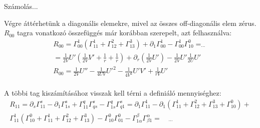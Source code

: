 \documentclass[10pt]{beamer}
\begin{document}
\begin{frame}[t]{Számolás...}
\par Végre áttérhetünk a diagonális elemekre, mivel az összes off-diagonális elem zérus. $R_{00}$ tagra vonatkozó összefüggés már 
korábban szerepelt, azt felhasználva:
\begin{gather*}
R_{00} = \Gamma_{00}^{1}(\Gamma_{11}^{1} + \Gamma_{12}^{2} + \Gamma_{13}^{3}) + \partial_{1}\Gamma_{00}^{1} - \Gamma_{00}^{1}
\Gamma_{10}^{0} = _{\cdots} \\
= \frac{1}{2V}U'(\frac{1}{2V}V' + \frac{1}{r} + \frac{1}{r}) + \partial_{r}(\frac{1}{2V}U') - \frac{1}{2V}U'\frac{1}{2U}U' \\
R_{00} = \frac{1}{2V}U'' - \frac{1}{4UV}U'^{2} - \frac{1}{4V^{2}}U'V' + \frac{1}{rV}U' \\
\end{gather*}
\par A többi tag kiszámításához visszak kell térni a definiáló mennyiséghez:
\begin{gather*}
R_{11} = \partial_{s}\Gamma_{11}^{s} - \partial_{1}\Gamma_{1s}^{s} + \Gamma_{11}^{q}\Gamma_{qs}^{s} - \Gamma_{1s}^{q}\Gamma_{q1}^{s} =
\partial_{1}\Gamma_{11}^{1} - \partial_{1}(\Gamma_{11}^{1} + \Gamma_{12}^{2} + \Gamma_{13}^{3} + \Gamma_{10}^{0}) +\\ 
\Gamma_{11}^{1}(\Gamma_{10}^{0} + \Gamma_{11}^{1} + \Gamma_{12}^{2} + \Gamma_{13}^{3}) - \Gamma_{10}^{0}\Gamma_{01}^{0} -
\Gamma_{1\alpha}^{\beta}\Gamma_{\beta 1}^{\alpha} = \quad _{\cdots}
\end{gather*}
\end{frame}
\end{document}
